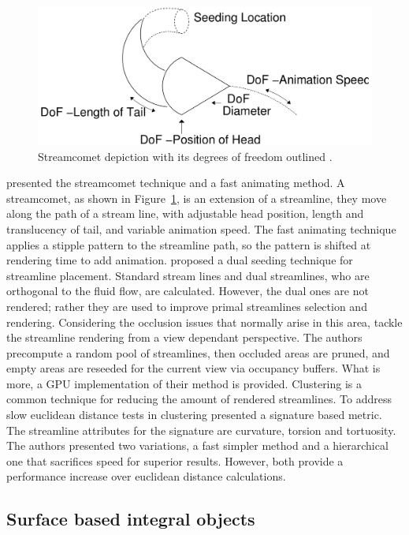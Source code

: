 \begin{figure}[htbp]
	\centering
	\includegraphics[scale=.2]{images/streamComet}
	\caption{Streamcomet depiction with its degrees of freedom outlined \cite{Laramee2005}.}
	\label{fig:streamComent}
\end{figure}

\cite{Laramee2005} presented the streamcomet technique and a fast animating method.
A streamcomet, as shown in Figure~\ref{fig:streamComent}, is an extension of a streamline, they move along the path of a stream line, with adjustable head position, length and translucency of tail, and variable animation speed.
The fast animating technique applies a stipple pattern to the streamline path, so the pattern is shifted at rendering time to add animation.
\cite{Rosanwo2009} proposed a dual seeding technique for streamline placement.
Standard stream lines and dual streamlines, who are orthogonal to the fluid flow, are calculated.
However, the dual ones are not rendered; rather they are used to improve primal streamlines selection and rendering.
Considering the occlusion issues that normally arise in this area, \cite{Marchesin2010} tackle the streamline rendering from a view dependant perspective.
The authors precompute a random pool of streamlines, then occluded areas are pruned, and empty areas are reseeded for the current view via occupancy buffers.
What is more, a GPU implementation of their method is provided.
Clustering is a common technique for reducing the amount of rendered streamlines.
To address slow euclidean distance tests in clustering \cite{McLoughlin2013} presented a signature based metric.
The streamline attributes for the signature are curvature, torsion and tortuosity.
The authors presented two variations, a fast simpler method and a hierarchical one that sacrifices speed for superior results.
However, both provide a performance increase over euclidean distance calculations.

\subsection{Surface based integral objects}

